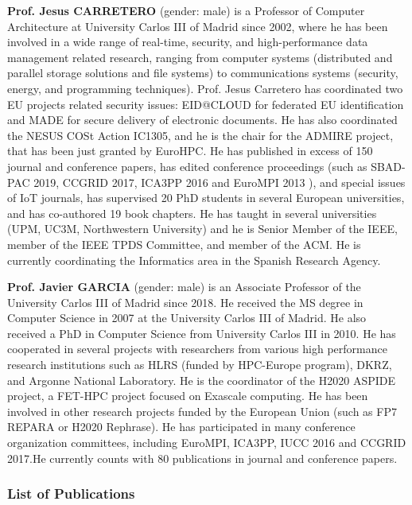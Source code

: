 \documentclass[a4paper,11pt]{article}
\begin{document}
\textbf{Prof. Jesus CARRETERO} (gender: male) is a Professor of Computer Architecture at University Carlos III of Madrid since 2002, where he has been involved in a wide range of real-time, security, and high-performance data management related research, ranging from computer systems (distributed and parallel storage solutions and file systems) to communications systems (security, energy, and programming techniques). Prof. Jesus Carretero has coordinated two EU projects related security issues: EID@CLOUD for federated EU identification and MADE for secure delivery of electronic documents.  He has also coordinated the NESUS COSt Action IC1305, and he is the chair for the ADMIRE project, that has been just granted by EuroHPC. He has published in excess of 150 journal and conference papers, has edited conference proceedings (such as SBAD-PAC 2019, CCGRID 2017, ICA3PP 2016 and EuroMPI 2013 ), and special issues of IoT journals, has supervised 20 PhD students in several European universities, and has co-authored 19 book chapters. He has taught in several universities (UPM, UC3M, Northwestern University) and he is Senior Member of the IEEE, member of the IEEE TPDS Committee, and member of the ACM. He is currently coordinating the Informatics area in the Spanish Research Agency. 

\textbf{Prof. Javier GARCIA} (gender: male) is an Associate Professor of the University Carlos III of Madrid since 2018. He received the MS degree in Computer Science in 2007 at the University Carlos III of Madrid. He also received a PhD in Computer Science from University Carlos III in 2010. He has cooperated in several
projects with researchers from various high performance research institutions such as HLRS (funded by HPC-Europe program), DKRZ, and Argonne National Laboratory. 
He is the coordinator of the H2020 ASPIDE project, a FET-HPC project focused on Exascale computing. He has been involved in other research projects funded by the European Union (such as FP7 REPARA or H2020 Rephrase). He has participated in many conference organization committees, including EuroMPI, ICA3PP, IUCC 2016 and CCGRID 2017.He currently counts with 80 publications in journal and conference papers.


\subsubsection*{List of Publications}
\end{document}
